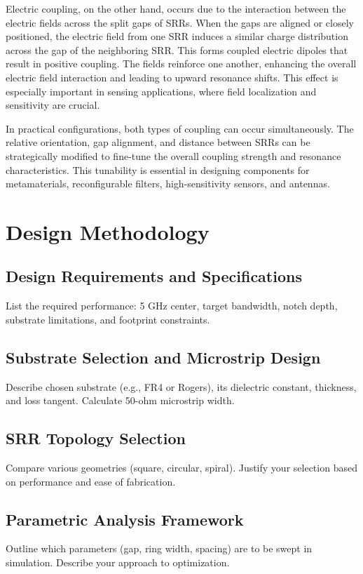 \documentclass[conference]{IEEEtran}
\begin{document}
Electric coupling, on the other hand, occurs due to the interaction between the electric fields across the split gaps of SRRs. When the gaps are aligned or closely positioned, the electric field from one SRR induces a similar charge distribution across the gap of the neighboring SRR. This forms coupled electric dipoles that result in positive coupling. The fields reinforce one another, enhancing the overall electric field interaction and leading to upward resonance shifts. This effect is especially important in sensing applications, where field localization and sensitivity are crucial.

In practical configurations, both types of coupling can occur simultaneously. The relative orientation, gap alignment, and distance between SRRs can be strategically modified to fine-tune the overall coupling strength and resonance characteristics. This tunability is essential in designing components for metamaterials, reconfigurable filters, high-sensitivity sensors, and antennas.

\section{Design Methodology}

\subsection{Design Requirements and Specifications}
List the required performance: 5 GHz center, target bandwidth, notch depth, substrate limitations, and footprint constraints.

\subsection{Substrate Selection and Microstrip Design}
Describe chosen substrate (e.g., FR4 or Rogers), its dielectric constant, thickness, and loss tangent. Calculate 50-ohm microstrip width.

\subsection{SRR Topology Selection}
Compare various geometries (square, circular, spiral). Justify your selection based on performance and ease of fabrication.

\subsection{Parametric Analysis Framework}
Outline which parameters (gap, ring width, spacing) are to be swept in simulation. Describe your approach to optimization.
\end{document}
